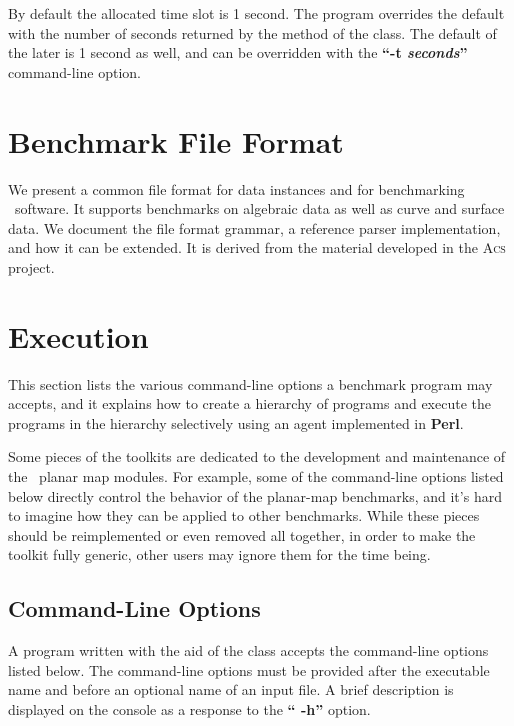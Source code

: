 By default the allocated time slot is 1 second. The program overrides the
default with the number of seconds returned by the
 method of the
 class. The default of the later is
1 second as well, and can be overridden with the \textbf{``-t {\em seconds}''}
command-line option.


\section{Benchmark File Format}
We present a common file format for data instances and for benchmarking 
\cgal\ software. It supports benchmarks on algebraic data as well as curve 
and surface data. We document the file format grammar, a reference parser 
implementation, and how it can be extended.
It is derived from the material developed in the \textsc{Acs} project.







\section{Execution}
This section lists the various command-line options a benchmark
program may accepts, and it explains how to create a hierarchy of
programs and execute the programs in the hierarchy selectively using
an agent implemented in \textbf{Perl}.

Some pieces of the toolkits are dedicated to the development and
maintenance of the \cgal\ planar map modules. For example, some of
the command-line options listed below directly control the behavior
of the planar-map benchmarks, and it's hard to imagine how they can be
applied to other benchmarks. While these pieces should be
reimplemented or even removed all together, in order to make the
toolkit fully generic, other users may ignore them for the time being.

\subsection{Command-Line Options}
A program written with the aid of the 
class accepts the command-line options listed below. The command-line options
must be provided after the executable name and before an optional name of an
input file. A brief description is displayed on the console as a
response to the \textbf{`` -h''} option.

